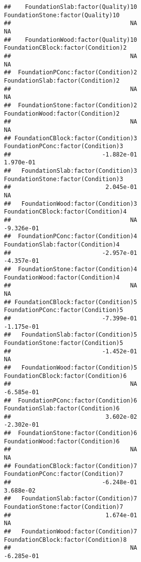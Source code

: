 \documentclass[
]{article}
\begin{document}
\begin{verbatim}
##    FoundationSlab:factor(Quality)10    FoundationStone:factor(Quality)10  
##                                  NA                                   NA  
##    FoundationWood:factor(Quality)10  FoundationCBlock:factor(Condition)2  
##                                  NA                                   NA  
##  FoundationPConc:factor(Condition)2    FoundationSlab:factor(Condition)2  
##                                  NA                                   NA  
##  FoundationStone:factor(Condition)2    FoundationWood:factor(Condition)2  
##                                  NA                                   NA  
## FoundationCBlock:factor(Condition)3   FoundationPConc:factor(Condition)3  
##                          -1.882e-01                            1.970e-01  
##   FoundationSlab:factor(Condition)3   FoundationStone:factor(Condition)3  
##                           2.045e-01                                   NA  
##   FoundationWood:factor(Condition)3  FoundationCBlock:factor(Condition)4  
##                                  NA                           -9.326e-01  
##  FoundationPConc:factor(Condition)4    FoundationSlab:factor(Condition)4  
##                          -2.957e-01                           -4.357e-01  
##  FoundationStone:factor(Condition)4    FoundationWood:factor(Condition)4  
##                                  NA                                   NA  
## FoundationCBlock:factor(Condition)5   FoundationPConc:factor(Condition)5  
##                          -7.399e-01                           -1.175e-01  
##   FoundationSlab:factor(Condition)5   FoundationStone:factor(Condition)5  
##                          -1.452e-01                                   NA  
##   FoundationWood:factor(Condition)5  FoundationCBlock:factor(Condition)6  
##                                  NA                           -6.585e-01  
##  FoundationPConc:factor(Condition)6    FoundationSlab:factor(Condition)6  
##                           3.602e-02                           -2.302e-01  
##  FoundationStone:factor(Condition)6    FoundationWood:factor(Condition)6  
##                                  NA                                   NA  
## FoundationCBlock:factor(Condition)7   FoundationPConc:factor(Condition)7  
##                          -6.248e-01                            3.688e-02  
##   FoundationSlab:factor(Condition)7   FoundationStone:factor(Condition)7  
##                           1.674e-01                                   NA  
##   FoundationWood:factor(Condition)7  FoundationCBlock:factor(Condition)8  
##                                  NA                           -6.285e-01  

\end{verbatim}
\end{document}
